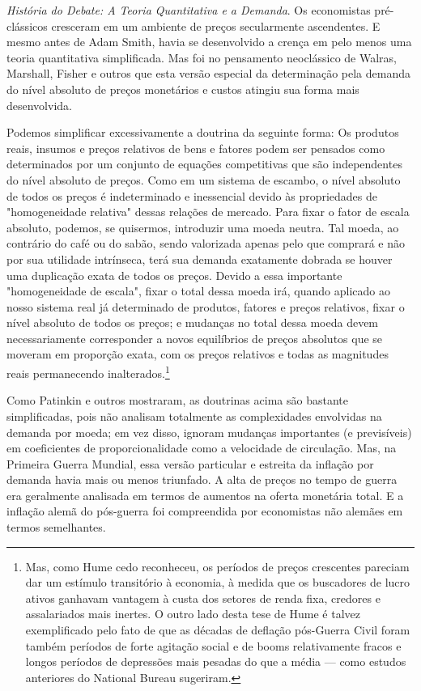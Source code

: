 \documentclass[12pt]{article}
\begin{document}
\textit{História do Debate: A Teoria Quantitativa e a Demanda}. Os economistas pré-clássicos cresceram em um ambiente de preços secularmente ascendentes. E mesmo antes de Adam Smith, havia se desenvolvido a crença em pelo menos uma teoria quantitativa simplificada. Mas foi no pensamento neoclássico de Walras, Marshall, Fisher e outros que esta versão especial da determinação pela demanda do nível absoluto de preços monetários e custos atingiu sua forma mais desenvolvida.

Podemos simplificar excessivamente a doutrina da seguinte forma: Os produtos reais, insumos e preços relativos de bens e fatores podem ser pensados como determinados por um conjunto de equações competitivas que são independentes do nível absoluto de preços. Como em um sistema de escambo, o nível absoluto de todos os preços é indeterminado e inessencial devido às propriedades de "homogeneidade relativa" dessas relações de mercado. Para fixar o fator de escala absoluto, podemos, se quisermos, introduzir uma moeda neutra. Tal moeda, ao contrário do café ou do sabão, sendo valorizada apenas pelo que comprará e não por sua utilidade intrínseca, terá sua demanda exatamente dobrada se houver uma duplicação exata de todos os preços. Devido a essa importante "homogeneidade de escala", fixar o total dessa moeda irá, quando aplicado ao nosso sistema real já determinado de produtos, fatores e preços relativos, fixar o nível absoluto de todos os preços; e mudanças no total dessa moeda devem necessariamente corresponder a novos equilíbrios de preços absolutos que se moveram em proporção exata, com os preços relativos e todas as magnitudes reais permanecendo inalterados.\footnote{Mas, como Hume cedo reconheceu, os períodos de preços crescentes pareciam dar um estímulo transitório à economia, à medida que os buscadores de lucro ativos ganhavam vantagem à custa dos setores de renda fixa, credores e assalariados mais inertes. O outro lado desta tese de Hume é talvez exemplificado pelo fato de que as décadas de deflação pós-Guerra Civil foram também períodos de forte agitação social e de booms relativamente fracos e longos períodos de depressões mais pesadas do que a média — como estudos anteriores do National Bureau sugeriram.}

Como Patinkin e outros mostraram, as doutrinas acima são bastante simplificadas, pois não analisam totalmente as complexidades envolvidas na demanda por moeda; em vez disso, ignoram mudanças importantes (e previsíveis) em coeficientes de proporcionalidade como a velocidade de circulação. Mas, na Primeira Guerra Mundial, essa versão particular e estreita da inflação por demanda havia mais ou menos triunfado. A alta de preços no tempo de guerra era geralmente analisada em termos de aumentos na oferta monetária total. E a inflação alemã do pós-guerra foi compreendida por economistas não alemães em termos semelhantes.
\end{document}
